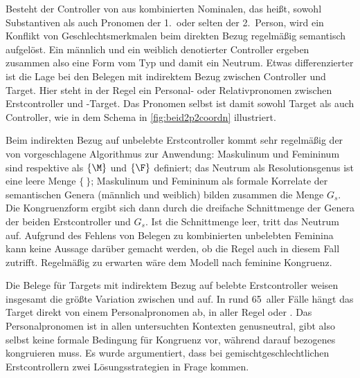 Besteht der Controller von  aus kombinierten Nominalen, das heißt,
sowohl Substantiven als auch Pronomen der 1.\ oder selten der 2.\ Person, wird
ein Konflikt von Geschlechtsmerkmalen beim direkten Bezug regelmäßig semantisch
aufgelöst. Ein männlich und ein weiblich denotierter Controller ergeben
zusammen also eine Form vom Typ  und damit ein Neutrum. Etwas
differenzierter ist die Lage bei den Belegen mit indirektem Bezug zwischen
Controller und Target. Hier steht in der Regel ein Personal- oder
Relativpronomen zwischen Erstcontroller und -Target. Das Pronomen
selbst ist damit sowohl Target als auch Controller, wie in dem Schema in
\cref{fig:beid2p2coordn} illustriert.

Beim indirekten Bezug auf unbelebte Erstcontroller kommt sehr regelmäßig der
von \textcites[577]{wechsler2009}[184]{wechslerzlatic2003} vorgeschlagene
Algorithmus zur Anwendung: Maskulinum und Femininum sind respektive als
$\{\M\}$ und $\{\F\}$ definiert; das Neutrum als Resolutionsgenus ist eine
leere Menge $\{\ \}$; Maskulinum und Femininum als formale Korrelate der
semantischen Genera (männlich und weiblich) bilden zusammen die Menge $G_s$.
Die Kongruenzform ergibt sich dann durch die dreifache Schnittmenge der Genera
der beiden Erstcontroller und $G_s$. Ist die Schnittmenge leer, tritt das
Neutrum auf. Aufgrund des Fehlens von Belegen zu kombinierten unbelebten
Feminina kann keine Aussage darüber gemacht werden, ob die Regel auch in diesem
Fall zutrifft. Regelmäßig zu erwarten wäre dem Modell nach feminine Kongruenz.

Die Belege für Targets mit indirektem Bezug auf belebte Erstcontroller weisen
insgesamt die größte Variation zwischen  und  auf. In
rund 65\pct\ aller Fälle hängt das Target direkt von einem Personalpronomen ab,
in aller Regel  oder . Das Personalpronomen ist in allen
untersuchten Kontexten genusneutral, gibt also selbst keine formale Bedingung
für Kongruenz vor, während darauf bezogenes  kongruieren muss.
Es wurde argumentiert, dass bei gemischtgeschlechtlichen Erstcontrollern zwei
Lösungsstrategien in Frage kommen.


